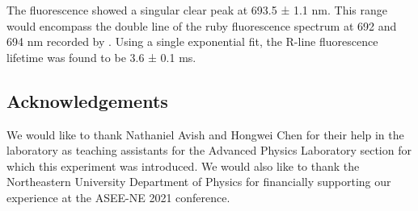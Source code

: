\documentclass[11pt, a4paper, twocolumn]{article}
\begin{document}
The fluorescence showed a singular clear peak at 693.5 ± 1.1 nm. This range would encompass the double line of the ruby fluorescence spectrum at 692 and 694 nm recorded by \cite{Kumari, Mani}. Using a single exponential fit, the R-line fluorescence lifetime was found to be 3.6 ± 0.1 ms.

\subsection*{Acknowledgements}
We would like to thank Nathaniel Avish and Hongwei Chen for their help in the laboratory as teaching assistants for the Advanced Physics Laboratory section for which this experiment was introduced. We would also like to thank the Northeastern University Department of Physics for financially supporting our experience at the ASEE-NE 2021 conference.
\nocite{*}

\footnotesize{}
\end{document}
